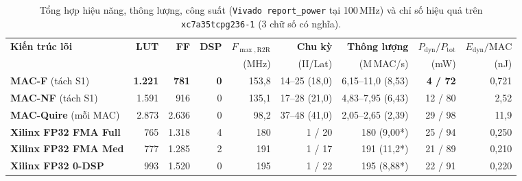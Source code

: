 \begin{table}[!htbp]
  \centering
  \caption{Tổng hợp hiệu năng, thông lượng, công suất (\texttt{Vivado report\_power} tại 100\,MHz) và chỉ số hiệu quả trên \texttt{xc7a35tcpg236-1} (3 chữ số có nghĩa).}
  \label{tab:fpga-power-throughput}
  \footnotesize
  \setlength{\tabcolsep}{2.8pt}
  \renewcommand{\arraystretch}{1.12}
  \begin{tabularx}{\textwidth}{@{}>{\raggedright\arraybackslash}p{31mm} r r r r r r r r@{}}
    \toprule
    \textbf{Kiến trúc lõi} & \textbf{LUT} & \textbf{FF} & \textbf{DSP} & \textbf{$F_{\max,\mathrm{R2R}}$} & \textbf{Chu kỳ} & \textbf{Thông lượng} & \textbf{$P_{\mathrm{dyn}}/P_{\mathrm{tot}}$} & \textbf{$E_{\mathrm{dyn}}/\mathrm{MAC}$} \\
    & & & & (MHz) & (II/Lat) & (M\,MAC/s) & (mW) & (nJ) \\
    \midrule
    \textbf{MAC-F} (tách S1) & \textbf{1.221} & \textbf{781} & \textbf{0} & 153,8 & 14--25 (18,0) & 6,15--11,0 (8,53) & \textbf{4 / 72} & 0,721 \\
    \textbf{MAC-NF} (tách S1) & 1.591 & 916 & 0 & 135,1 & 17--28 (21,0) & 4,83--7,95 (6,43) & 12 / 80 & 2,52 \\
    \textbf{MAC-Quire} (mỗi MAC) & 2.873 & 2.636 & 0 & 98,2 & 37--48 (41,0) & 2,05--2,65 (2,39) & 29 / 98 & 11,9 \\
    \midrule
    \textbf{Xilinx FP32 FMA Full} & 765 & 1.318 & 4 & 180 & 1 / 20 & 180 (9,00*) & 25 / 94 & 0,250 \\
    \textbf{Xilinx FP32 FMA Med} & 777 & 1.285 & 2 & 191 & 1 / 17 & 191 (11,2*) & 21 / 89 & 0,210 \\
    \textbf{Xilinx FP32 0-DSP} & 993 & 1.520 & 0 & 195 & 1 / 22 & 195 (8,88*) & 22 / 91 & 0,220 \\
    \bottomrule
  \end{tabularx}
  \vspace{2pt}

\end{table}
